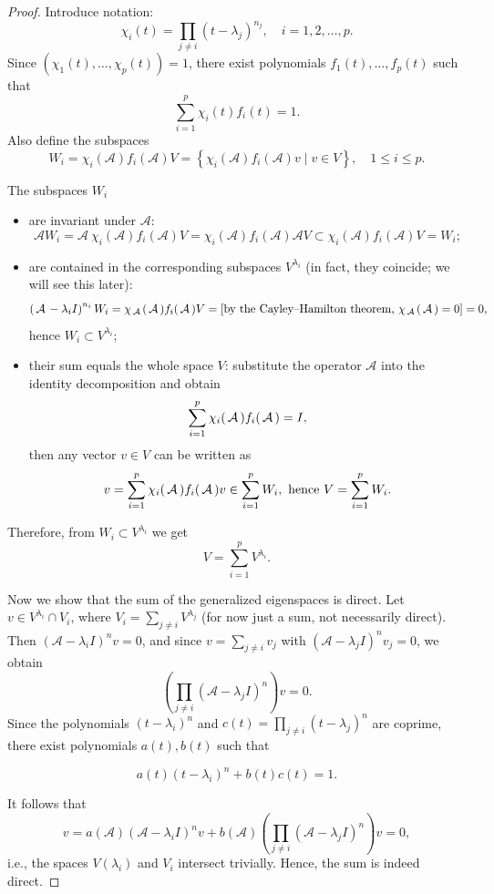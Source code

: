 \begin{proof}
Introduce notation:
$$
\chi_i(t)=\prod_{j \neq i}\left(t-\lambda_j\right)^{n_j}, \quad i=1,2, \ldots, p.
$$
Since $\left(\chi_1(t), \ldots, \chi_p(t)\right)=1$, there exist polynomials $f_1(t), \ldots, f_p(t)$ such that 
$$
\sum_{i=1}^p \chi_i(t) f_i(t)=1.
$$
Also define the subspaces
$$
W_i=\chi_i(\mathcal{A}) f_i(\mathcal{A}) V=\left\{\chi_i(\mathcal{A}) f_i(\mathcal{A}) v \mid v \in V\right\}, \quad 1 \leqslant i \leqslant p.
$$

The subspaces $W_i$ 
\begin{itemize}
\item are invariant under $\mathcal{A}$:
$$
\mathcal{A} W_i= \mathcal{A}~\chi_i(\mathcal{A}) f_i(\mathcal{A}) V=\chi_i(\mathcal{A}) f_i(\mathcal{A}) \mathcal{A} V \subset \chi_i(\mathcal{A}) f_i(\mathcal{A}) V=W_i;
$$
\item are contained in the corresponding subspaces $V^{\lambda_i}$ (in fact, they coincide; we will see this later):
$$
\left(\,\mathcal{A}\,-\lambda_i I\right)^{n_i} W_i=\chi_{\,\mathcal{A}\,}(\,\mathcal{A}\,) f_i(\,\mathcal{A}\,) V=\text{[by the Cayley--Hamilton theorem, } \chi_{\,\mathcal{A}\,}(\,\mathcal{A}\,) =  0 \text{]}=0, 
$$
hence $W_i \subset V^{\lambda_i};$
\item their sum equals the whole space $V$:
substitute the operator $\mathcal{A}$ into the identity decomposition and obtain 
$$\sum_{i=1}^p \chi_i(\,\mathcal{A}\,) f_i(\,\mathcal{A}\,)=I,$$
then any vector $v \in V$ can be written as 
$$v = \sum_{i=1}^p \chi_i(\,\mathcal{A}\,) f_i(\,\mathcal{A}\,) v \in \sum_{i=1}^p W_i, \text{ hence } V = \sum_{i=1}^p W_i. $$
\end{itemize}

Therefore, from $W_i\subset V^{\lambda_i}$ we get $$V =  \sum_{i=1}^p V^{\lambda_i}. $$

Now we show that the sum of the generalized eigenspaces is direct. Let $v \in V^{\lambda_i} \cap V_i$, where $V_i=\sum_{j \neq i} V^{\lambda_j}$ (for now just a sum, not necessarily direct). Then $\left(\mathcal{A}-\lambda_i I\right)^n v=0$, and since $v=\sum_{j \neq i} v_j$ with $\left(\mathcal{A}-\lambda_j I\right)^n v_j=0$, we obtain 
$$\left(\prod_{j \neq i}\left(\mathcal{A}-\lambda_j I\right)^n\right) v=0.
$$
Since the polynomials $\left(t-\lambda_i\right)^n$ and $c(t)=\prod_{j \neq i}\left(t-\lambda_j\right)^n$ are coprime, there exist polynomials $a(t), b(t)$ such that

$$
a(t)\left(t-\lambda_i\right)^n+b(t) c(t)=1 .
$$

It follows that
$$
v=a(\mathcal{A})\left(\mathcal{A}-\lambda_i I\right)^n v+b(\mathcal{A})\left(\prod_{j \neq i}\left(\mathcal{A}-\lambda_j I\right)^n\right) v=0,
$$
i.e., the spaces $V\left(\lambda_i\right)$ and $V_i$ intersect trivially. Hence, the sum is indeed direct.


\end{proof}
